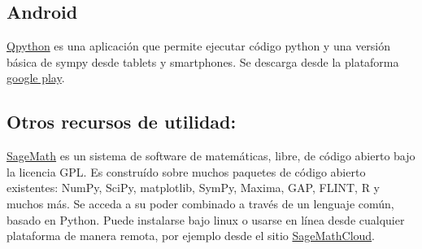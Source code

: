 \subsection{Android} \href{http://qpython.com/}{Qpython} es una aplicación que permite ejecutar código python y una versión básica de sympy desde tablets y smartphones. Se descarga desde la plataforma \href{https://play.google.com/store/apps/details?id=com.hipipal.qpyplus}{google play}.

\subsection{Otros recursos de utilidad:} 

\href{http://www.sagemath.org/}{SageMath}  es un sistema de software
de matemáticas, libre, de código abierto bajo la licencia GPL. 
Es construído sobre  muchos paquetes de código abierto existentes: 
NumPy, SciPy, matplotlib, SymPy, Maxima, GAP, FLINT, R y muchos más.
Se acceda a su poder combinado a través de un lenguaje común, basado en Python.
Puede instalarse bajo linux o usarse en línea desde cualquier plataforma de manera remota, 
por ejemplo desde el sitio \href{https://cloud.sagemath.com/}{SageMathCloud}.


